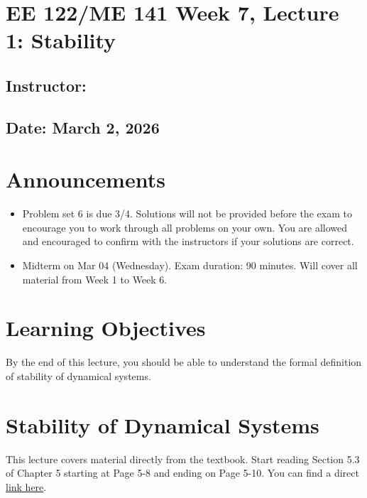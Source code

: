\documentclass{ee122_notes}
\renewcommand{\releasedate}{March 2, 2026}
\begin{document}
\section*{EE 122/ME 141 Week 7, Lecture 1: Stability}
\subsection*{Instructor: \instructor}
\subsection*{Date: \releasedate}
\section{Announcements}
\begin{itemize}
    \item Problem set 6 is due 3/4. Solutions will not be provided before the exam to encourage you to work through all problems on your own. You are allowed and encouraged to confirm with the instructors if your solutions are correct.
    \item Midterm on Mar 04 (Wednesday). Exam duration: 90 minutes. Will cover all material from Week 1 to Week 6.
\end{itemize}
\section{Learning Objectives}
By the end of this lecture, you should be able to understand the formal definition of stability of dynamical systems. 
\section{Stability of Dynamical Systems}
This lecture covers material directly from the textbook. Start reading Section 5.3 of Chapter 5 starting at Page 5-8 and ending on Page 5-10. You can find a direct \href{https://www.cds.caltech.edu/~murray/books/AM08/pdf/fbs-dynamics\_24Jul2020.pdf}{link here}.
\end{document}
